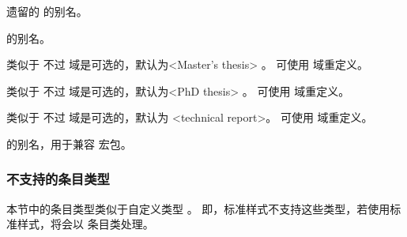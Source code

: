 \begin{typelist}

\BibTeX 遗留的  的别名。

的别名。

类似于  不过  域是可选的，默认为<Master's thesis> 。
可使用  域重定义。

类似于  不过  域是可选的，默认为<PhD thesis> 。
可使用  域重定义。

类似于 不过  域是可选的，默认为 <technical report>。
可使用  域重定义。

 的别名，用于兼容  宏包。

\end{typelist}

\subsubsection{不支持的条目类型}
\label{bib:typ:ctm}


本节中的条目类型类似于自定义类型 。
即，标准样式不支持这些类型，若使用标准样式，将会以  条目类处理。

